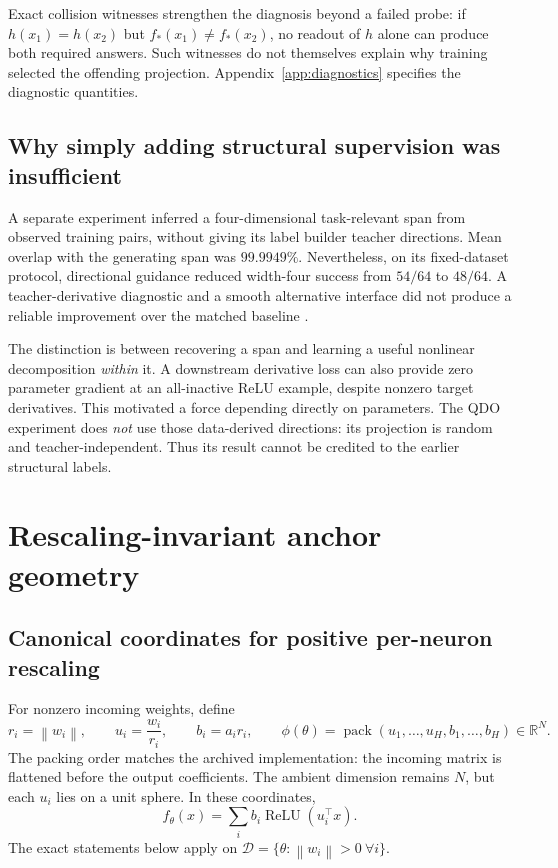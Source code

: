 \documentclass[11pt,letterpaper]{article}
\theoremstyle{remark}\newtheorem{remark}{Remark}
\newcommand{\R}{\mathbb R}
\newcommand{\relu}{\operatorname{ReLU}}
\newcommand{\norm}[1]{\left\lVert#1\right\rVert}
\begin{document}
Exact collision witnesses strengthen the diagnosis beyond a failed probe: if $h(x_1)=h(x_2)$ but $f_*(x_1)\ne f_*(x_2)$, no readout of $h$ alone can produce both required answers. Such witnesses do not themselves explain why training selected the offending projection. Appendix~\ref{app:diagnostics} specifies the diagnostic quantities.

\subsection{Why simply adding structural supervision was insufficient}
A separate experiment inferred a four-dimensional task-relevant span from observed training pairs, without giving its label builder teacher directions. Mean overlap with the generating span was $99.9949\%$. Nevertheless, on its fixed-dataset protocol, directional guidance reduced width-four success from $54/64$ to $48/64$. A teacher-derivative diagnostic and a smooth alternative interface did not produce a reliable improvement over the matched baseline \cite{artifactDirectional}.

The distinction is between recovering a span and learning a useful nonlinear decomposition \emph{within} it. A downstream derivative loss can also provide zero parameter gradient at an all-inactive ReLU example, despite nonzero target derivatives. This motivated a force depending directly on parameters. The QDO experiment does \emph{not} use those data-derived directions: its projection is random and teacher-independent. Thus its result cannot be credited to the earlier structural labels.

\section{Rescaling-invariant anchor geometry}\label{sec:geometry}
\subsection{Canonical coordinates for positive per-neuron rescaling}
For nonzero incoming weights, define
\begin{equation}\label{eq:phi}
r_i=\norm{w_i},\qquad u_i=\frac{w_i}{r_i},\qquad b_i=a_i r_i,
\qquad \phi(\theta)=\operatorname{pack}(u_1,\ldots,u_H,b_1,\ldots,b_H)\in\R^N.
\end{equation}
The packing order matches the archived implementation: the incoming matrix is flattened before the output coefficients. The ambient dimension remains $N$, but each $u_i$ lies on a unit sphere. In these coordinates,
\begin{equation}
f_\theta(x)=\sum_i b_i\relu(u_i^\top x).
\end{equation}
The exact statements below apply on
$\mathcal D=\{\theta:\norm{w_i}>0\ \forall i\}$.
\end{document}
